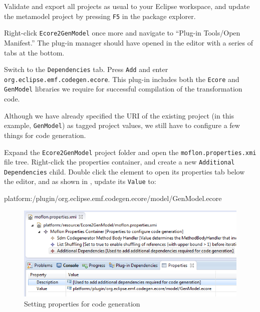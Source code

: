 \begin{stepbystep}
\item Validate and export all projects as usual to your Eclipse workspace, and update the metamodel project by pressing \texttt{F5} in
the package explorer.

\item Right-click \texttt{Ecore2GenModel} once more and navigate to ``Plug-in Tools/Open Manifest.'' The plug-in manager should have
opened in the editor with a series of tabs at the bottom.

\item Switch to the \texttt{Dependencies} tab. Press \texttt{Add} and enter \texttt{org.\-eclipse.\-emf.\-codegen.\-ecore}. This plug-in
includes both the \texttt{Ecore} and \texttt{Gen\-Mod\-el} libraries we require for successful compilation of the transformation code.

\end{stepbystep}

Although we have already specified the URI of the existing project (in this example, \texttt{GenModel}) as tagged project values, we still have to 
configure a few things for code generation.

\begin{stepbystep}
  
\item Expand the \texttt{Ecore2GenModel} project folder and open the \texttt{mof\-lon.\-prop\-er\-ties.\-xmi} file tree. Right-click the
properties container, and create a new \texttt{Add\-it\-ion\-al Dep\-en\-den\-cies} child. Double click the element to open its properties tab below the
editor, and as shown in , update its \texttt{Value} to:\\
\end{stepbystep}

\vspace{-1cm}
{\small \ttfamily  platform:/plugin/org.eclipse.emf.codegen.ecore/model/GenModel.ecore} \\
\vspace{-0.5cm}

\begin{figure}[htbp]
\begin{centering}
\includegraphics[width=\textwidth]{../../org.moflon.doc.handbook.05_miscellaneous/3_existingEMF/emfImages/eclipse_additDepProps}
  \caption{Setting properties for code generation}  
  \label{eclipse:addDepChild}
\end{centering}
\end{figure} 

